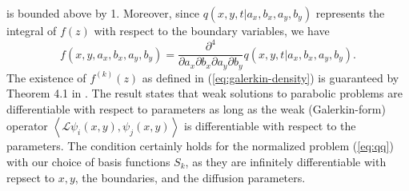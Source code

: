 \documentclass[10pt]{article}
\begin{document}
is bounded above by 1. Moreover, since $q(x,y,t|a_x,b_x,a_y,b_y)$ represents the
integral of $f(z)$ with respect to the boundary variables, we have
\[
  f(x,y,a_x,b_x,a_y,b_y) = \frac{\partial^4}{\partial a_x \partial b_x \partial a_y \partial
         b_y} q(x,y,t | a_x, b_x, a_y, b_y).
\]
The existence of $f^{(k)}(z)$ as defined in
(\ref{eq:galerkin-density}) is guaranteed by Theorem 4.1 in
\cite{singler2008differentiability}. The result states that weak
solutions to parabolic problems are differentiable with respect to
parameters as long as the weak (Galerkin-form) operator
$\left< \mathcal{L} \psi_i(x,y), \psi_j(x,y) \right>$ is
differentiable with respect to the parameters. The condition certainly
holds for the normalized problem (\ref{eq:qq}) with our choice of
basis functions $S_k$, as they are infinitely differentiable with
repsect to $x,y$, the boundaries, and the diffusion parameters. 
\end{document}
